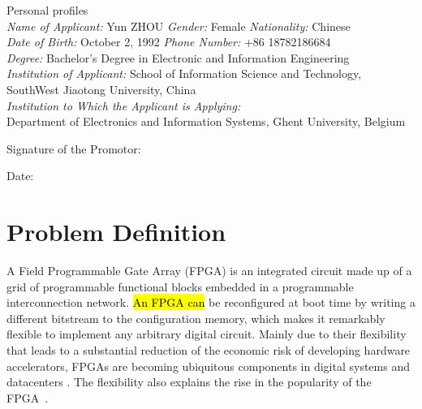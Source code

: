 \documentclass[a4paper,oneside,12pt]{article}
\begin{document}
\vspace{5mm}
\begin{description*}

\item[Personal profiles]\ \\

\emph{Name of Applicant:} Yun ZHOU
\hspace{10mm}\emph{Gender:} Female
\hspace{10mm}\emph{Nationality:} Chinese\\
\emph{Date of Birth:} October 2, 1992
\hspace{13mm}\emph{Phone Number:} +86 18782186684\\
\emph{Degree:} Bachelor's Degree in Electronic and Information Engineering\\
\emph{Institution of Applicant:} School of Information Science and Technology, SouthWest Jiaotong University, China\\
\emph{Institution to Which the Applicant is Applying:}\\
Department of Electronics and Information Systems, Ghent University, Belgium
\end{description*}
\begin{description*}
\item[Signature of the Promotor:]\ \\
\item[Date:]\
\end{description*}
\clearpage

\section{Problem Definition}
A Field Programmable Gate Array (FPGA) is an integrated circuit made up of a grid of programmable functional blocks embedded in a programmable interconnection network. \hl{An FPGA can} be reconfigured  at boot time by writing a different bitstream to the configuration memory, which makes it remarkably flexible to implement any arbitrary digital circuit.
Mainly due to their flexibility that leads to a substantial reduction of the economic risk of developing hardware accelerators, FPGAs are becoming ubiquitous components in digital systems and datacenters \cite{ovtcharov2015accelerating,putnam2015reconfigurable}. The flexibility also explains the rise in the popularity of the FPGA~\cite{putnam2015reconfigurable}.
\end{document}
